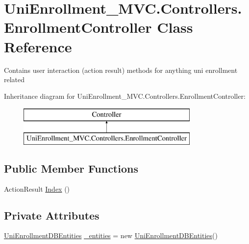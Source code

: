 \hypertarget{class_uni_enrollment___m_v_c_1_1_controllers_1_1_enrollment_controller}{}\section{Uni\+Enrollment\+\_\+\+M\+V\+C.\+Controllers.\+Enrollment\+Controller Class Reference}
\label{class_uni_enrollment___m_v_c_1_1_controllers_1_1_enrollment_controller}


Contains user interaction (action result) methods for anything uni \textquotesingle{}enrollment\textquotesingle{} related  


Inheritance diagram for Uni\+Enrollment\+\_\+\+M\+V\+C.\+Controllers.\+Enrollment\+Controller\+:\begin{figure}[H]
\begin{center}
\leavevmode
\includegraphics[height=2.000000cm]{class_uni_enrollment___m_v_c_1_1_controllers_1_1_enrollment_controller}
\end{center}
\end{figure}
\subsection*{Public Member Functions}
\begin{DoxyCompactItemize}
\item 
Action\+Result \hyperlink{class_uni_enrollment___m_v_c_1_1_controllers_1_1_enrollment_controller_a51461ec245f6264cce72f5c3ed9780f9}{Index} ()
\end{DoxyCompactItemize}
\subsection*{Private Attributes}
\begin{DoxyCompactItemize}
\item 
\hyperlink{class_uni_enrollment___m_v_c_1_1_models_1_1_uni_enrollment_d_b_entities}{Uni\+Enrollment\+D\+B\+Entities} \hyperlink{class_uni_enrollment___m_v_c_1_1_controllers_1_1_enrollment_controller_a98cfd96a937df03e8dbac2da9d04ede8}{\+\_\+entities} = new \hyperlink{class_uni_enrollment___m_v_c_1_1_models_1_1_uni_enrollment_d_b_entities}{Uni\+Enrollment\+D\+B\+Entities}()
\end{DoxyCompactItemize}


